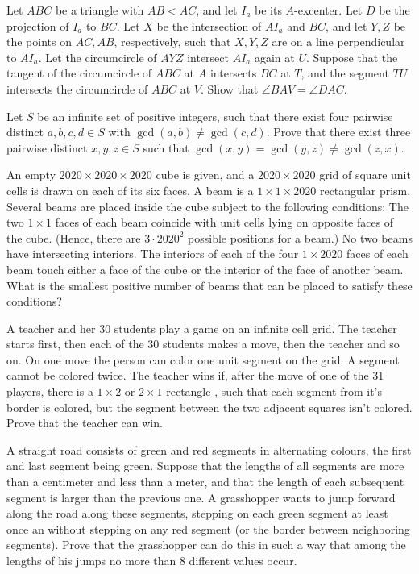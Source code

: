\documentclass[11pt]{scrartcl}
\begin{document}
\begin{problem}[7017112574129036660]
	Let $ABC$ be a triangle with $AB<AC$, and let $I_a$ be its $A$-excenter. Let $D$ be the projection of $I_a$ to $BC$. Let $X$ be the intersection of $AI_a$ and $BC$, and let $Y,Z$ be the points on $AC,AB$, respectively, such that $X,Y,Z$ are on a line perpendicular to $AI_a$. Let the circumcircle of $AYZ$ intersect $AI_a$ again at $U$. Suppose that the tangent of the circumcircle of $ABC$ at $A$ intersects $BC$ at $T$, and the segment $TU$ intersects the circumcircle of $ABC$ at $V$. Show that $\angle BAV=\angle DAC$.
\end{problem}
\begin{problem}[6783316811528119504]
Let $S$ be an infinite set of positive integers, such that there exist four pairwise distinct $a,b,c,d \in S$ with $\gcd(a,b) \neq \gcd(c,d)$. Prove that there exist three pairwise distinct $x,y,z \in S$ such that $\gcd(x,y)=\gcd(y,z) \neq \gcd(z,x)$.
\end{problem}
\begin{problem}[4320337590540710547]
	An empty $2020 \times 2020 \times 2020$ cube is given, and a $2020 \times 2020$ grid of square unit cells is drawn on each of its six faces. A beam is a $1 \times 1 \times 2020$ rectangular prism. Several beams are placed inside the cube subject to the following conditions:
The two $1 \times 1$ faces of each beam coincide with unit cells lying on opposite faces of the cube. (Hence, there are $3 \cdot {2020}^2$ possible positions for a beam.)
No two beams have intersecting interiors.
The interiors of each of the four $1 \times 2020$ faces of each beam touch either a face of the cube or the interior of the face of another beam.
What is the smallest positive number of beams that can be placed to satisfy these conditions?
\end{problem}
\begin{problem}[303061622555285]
A teacher and her 30 students play a game on an infinite cell grid. The teacher starts first, then each of the 30 students makes a move, then the teacher and so on. On one move the person can color one unit segment on the grid. A segment cannot be colored twice. The teacher wins if, after the move of one of the 31 players, there is a $1\times 2$ or $2\times 1$ rectangle , such that each segment from it's border is colored, but the segment between the two adjacent squares isn't colored. Prove that the teacher can win.
\end{problem}
\begin{problem}[221644122066923]
A straight road consists of green and red segments in alternating colours, the first and last segment being green. Suppose that the lengths of all segments are more than a centimeter and less than a meter, and that the length of each subsequent segment is larger than the previous one. A grasshopper wants to jump forward along the road along these segments, stepping on each green segment at least once an without stepping on any red segment (or the border between neighboring segments). Prove that the grasshopper can do this in such a way that among the lengths of his jumps no more than $8$ different values occur.
\end{problem}
\end{document}
